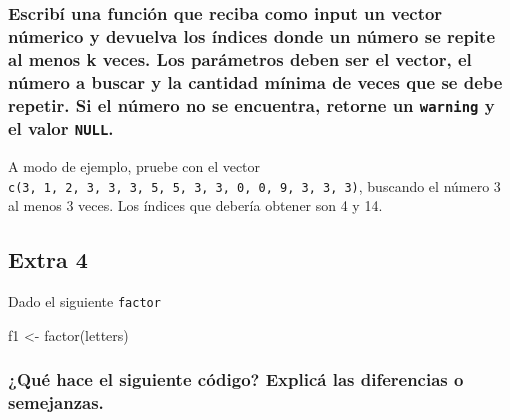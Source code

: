 \documentclass[
]{article}
\newenvironment{Shaded}{\begin{snugshade}}{\end{snugshade}}
\newcommand{\FunctionTok}[1]{\textcolor[rgb]{0.00,0.00,0.00}{#1}}
\newcommand{\NormalTok}[1]{#1}
\newcommand{\OtherTok}[1]{\textcolor[rgb]{0.56,0.35,0.01}{#1}}
\begin{document}
\hypertarget{escribuxed-una-funciuxf3n-que-reciba-como-input-un-vector-nuxfamerico-y-devuelva-los-uxedndices-donde-un-nuxfamero-se-repite-al-menos-k-veces.-los-paruxe1metros-deben-ser-el-vector-el-nuxfamero-a-buscar-y-la-cantidad-muxednima-de-veces-que-se-debe-repetir.-si-el-nuxfamero-no-se-encuentra-retorne-un-warning-y-el-valor-null.}{%
\subsubsection{\texorpdfstring{Escribí una función que reciba como input
un vector númerico y devuelva los índices donde un número se repite al
menos k veces. Los parámetros deben ser el vector, el número a buscar y
la cantidad mínima de veces que se debe repetir. Si el número no se
encuentra, retorne un \texttt{warning} y el valor
\texttt{NULL}.}{Escribí una función que reciba como input un vector númerico y devuelva los índices donde un número se repite al menos k veces. Los parámetros deben ser el vector, el número a buscar y la cantidad mínima de veces que se debe repetir. Si el número no se encuentra, retorne un warning y el valor NULL.}}\label{escribuxed-una-funciuxf3n-que-reciba-como-input-un-vector-nuxfamerico-y-devuelva-los-uxedndices-donde-un-nuxfamero-se-repite-al-menos-k-veces.-los-paruxe1metros-deben-ser-el-vector-el-nuxfamero-a-buscar-y-la-cantidad-muxednima-de-veces-que-se-debe-repetir.-si-el-nuxfamero-no-se-encuentra-retorne-un-warning-y-el-valor-null.}}

A modo de ejemplo, pruebe con el vector
\texttt{c(3,\ 1,\ 2,\ 3,\ 3,\ 3,\ 5,\ 5,\ 3,\ 3,\ 0,\ 0,\ 9,\ 3,\ 3,\ 3)},
buscando el número 3 al menos 3 veces. Los índices que debería obtener
son 4 y 14.

\hypertarget{extra-4}{%
\subsection{Extra 4}\label{extra-4}}

Dado el siguiente \texttt{factor}

\begin{Shaded}
\begin{Highlighting}[]
\NormalTok{f1 }\OtherTok{\textless{}{-}} \FunctionTok{factor}\NormalTok{(letters)}
\end{Highlighting}
\end{Shaded}

\hypertarget{quuxe9-hace-el-siguiente-cuxf3digo-explicuxe1-las-diferencias-o-semejanzas.}{%
\subsubsection{¿Qué hace el siguiente código? Explicá las diferencias o
semejanzas.}\label{quuxe9-hace-el-siguiente-cuxf3digo-explicuxe1-las-diferencias-o-semejanzas.}}
\end{document}
